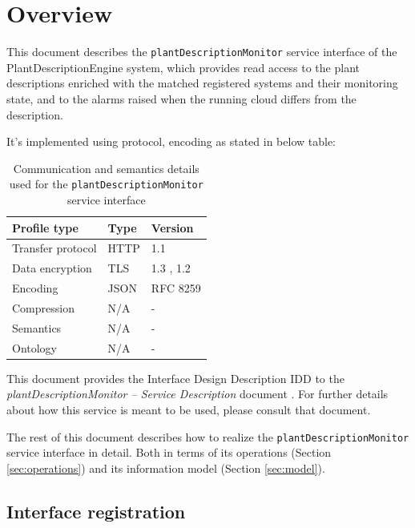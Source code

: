 \documentclass[a4paper]{arrowhead}
\begin{document}
\section{Overview}
\label{sec:overview}

This document describes the \texttt{plant\allowbreak{}Description\allowbreak{}Monitor} service interface of the PlantDescriptionEngine system, which provides read access to the plant descriptions enriched with the matched registered systems and their monitoring state, and to the alarms raised when the running cloud differs from the description.

It's implemented using protocol, encoding as stated in below table:
\begin{table}[ht!]
  \centering
  \begin{tabular}{|l|l|l|}
    \hline
    \rowcolor{gray!33} Profile type & Type & Version \\ \hline
    Transfer protocol & HTTP & 1.1 \cite{rfc9112} \\ \hline
    Data encryption & TLS & 1.3 \cite{rfc8446}, 1.2 \cite{rfc5246} \\ \hline
    Encoding & JSON & RFC 8259 \cite{rfc8259} \\ \hline
    Compression & N/A & - \\ \hline
    Semantics & N/A & - \\ \hline
    Ontology & N/A & - \\ \hline
  \end{tabular}
  \caption{Communication and semantics details used for the \texttt{plant\allowbreak{}Description\allowbreak{}Monitor} service interface}
  \label{tab:comunication_semantics_profile}
\end{table}

This document provides the Interface Design Description IDD to the \textit{plantDescriptionMonitor -- Service Description} document \cite{pde-plantDescriptionMonitor-sd}.
For further details about how this service is meant to be used, please consult that document.

The rest of this document describes how to realize the \texttt{plant\allowbreak{}Description\allowbreak{}Monitor} service
interface in detail. Both in terms of its operations (Section \ref{sec:operations}) and its information model (Section \ref{sec:model}).

\subsection{Interface registration}
\end{document}
